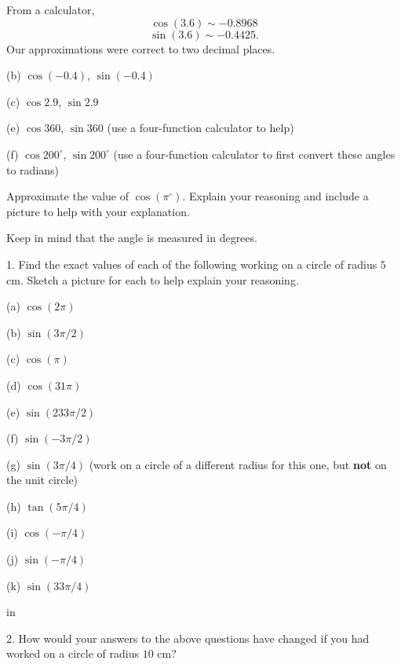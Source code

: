 \documentclass{ximera}
\newcommand{\pskip}{\vskip 0.1 in}
\begin{document}
\begin{exploration}
\begin{explanation}
From a calculator,
\[
   \cos (3.6) \sim -0.8968
\]
\[
    \sin(3.6) \sim -0.4425 .
\]
Our approximations were correct to two decimal places.

\end{explanation}

(b) $\cos (-0.4)$,  $\sin (-0.4)$ %

(c) $\cos 2.9$, $\sin 2.9$ %


(e) $\cos 360$, $\sin 360$ (use a four-function calculator to help)

(f) $\cos 200^\circ$, $\sin 200^\circ$ (use a four-function calculator to first convert these angles to radians)

 
\begin{onlineOnly}
    \begin{center}
\end{center}
\end{onlineOnly}
\end{exploration}

\begin{question} \label{Q2:Cosine}
Approximate the value of $\cos (\pi^\circ)$. Explain your reasoning and include a picture to help with your explanation.
\begin{hint}
Keep in mind that the angle is measured in degrees.
\end{hint}
\end{question}


\begin{question}  \label{Q346fr:Cosine}
1. Find the exact values of each of the following working on a circle of radius $5$cm. Sketch a picture for each to help explain your reasoning. 

(a) $\cos (2\pi)$

(b) $\sin(3\pi/2)$

(c) $\cos(\pi)$

(d) $\cos(31\pi)$

(e) $\sin (233\pi/2)$

(f) $\sin(-3\pi/2)$

(g) $\sin(3\pi/4)$   (work on a circle of a different radius for this one, but {\bf not} on the unit circle)

(h) $\tan(5\pi/4)$

(i) $\cos(-\pi/4)$

(j) $\sin(-\pi/4)$

(k) $\sin(33\pi/4)$

\pskip

2. How would your answers to the above questions have changed if you had worked on a circle of radius $10$ cm?

\end{question}
\end{document}
